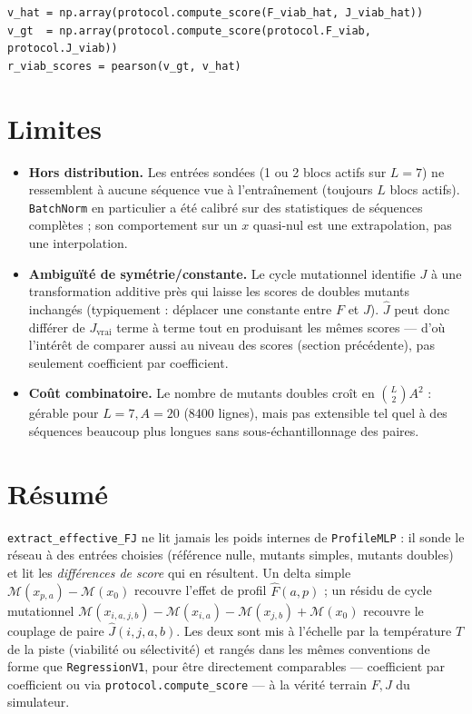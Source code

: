 \documentclass[11pt,a4paper]{article}
\newcommand{\M}{\mathcal{M}}
\begin{document}
\begin{lstlisting}
v_hat = np.array(protocol.compute_score(F_viab_hat, J_viab_hat))
v_gt  = np.array(protocol.compute_score(protocol.F_viab, protocol.J_viab))
r_viab_scores = pearson(v_gt, v_hat)
\end{lstlisting}

\section{Limites}

\begin{itemize}
    \item \textbf{Hors distribution.} Les entrées sondées (1 ou 2 blocs actifs sur $L=7$)
          ne ressemblent à aucune séquence vue à l'entraînement (toujours $L$ blocs actifs).
          \texttt{BatchNorm} en particulier a été calibré sur des statistiques de séquences
          complètes ; son comportement sur un $x$ quasi-nul est une extrapolation, pas une
          interpolation.
    \item \textbf{Ambiguïté de symétrie/constante.} Le cycle mutationnel identifie $J$ à une
          transformation additive près qui laisse les scores de doubles mutants inchangés
          (typiquement : déplacer une constante entre $F$ et $J$). $\hat J$ peut donc différer
          de $J_{\text{vrai}}$ terme à terme tout en produisant les mêmes scores --- d'où
          l'intérêt de comparer aussi au niveau des scores (section précédente), pas seulement
          coefficient par coefficient.
    \item \textbf{Coût combinatoire.} Le nombre de mutants doubles croît en $\binom{L}{2}A^2$ :
          gérable pour $L=7,A=20$ (8400 lignes), mais pas extensible tel quel à des séquences
          beaucoup plus longues sans sous-échantillonnage des paires.
\end{itemize}

\section{Résumé}

\begin{mdframed}
\texttt{extract\_effective\_FJ} ne lit jamais les poids internes de \texttt{ProfileMLP} : il
sonde le réseau à des entrées choisies (référence nulle, mutants simples, mutants doubles) et
lit les \emph{différences de score} qui en résultent. Un delta simple $\M(x_{p,a})-\M(x_0)$
recouvre l'effet de profil $\hat F(a,p)$ ; un résidu de cycle mutationnel
$\M(x_{i,a,j,b}) - \M(x_{i,a}) - \M(x_{j,b}) + \M(x_0)$ recouvre le couplage de paire
$\hat J(i,j,a,b)$. Les deux sont mis à l'échelle par la température $T$ de la piste
(viabilité ou sélectivité) et rangés dans les mêmes conventions de forme que
\texttt{RegressionV1}, pour être directement comparables --- coefficient par coefficient ou
via \texttt{protocol.compute\_score} --- à la vérité terrain $F,J$ du simulateur.
\end{mdframed}
\end{document}
